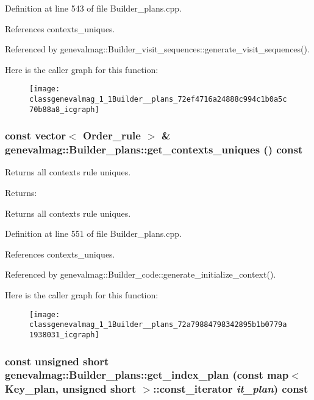 Definition at line 543 of file Builder\_\-plans.cpp.

References contexts\_\-uniques.

Referenced by genevalmag::Builder\_\-visit\_\-sequences::generate\_\-visit\_\-sequences().

Here is the caller graph for this function:\nopagebreak
\begin{figure}[H]
\begin{center}
\leavevmode
\texttt{[image: classgenevalmag\_1\_1Builder\_\_plans\_72ef4716a24888c994c1b0a5c70b88a8\_icgraph]}
\end{center}
\end{figure}
\hypertarget{classgenevalmag_1_1Builder__plans_72a79884798342895b1b0779a1938031}{
\subsubsection[{get\_\-contexts\_\-uniques}]{\setlength{\rightskip}{0pt plus 5cm}const vector$<$ {\bf Order\_\-rule} $>$ \& genevalmag::Builder\_\-plans::get\_\-contexts\_\-uniques () const}}
\label{classgenevalmag_1_1Builder__plans_72a79884798342895b1b0779a1938031}


Returns all contexts rule uniques. \begin{Desc}
\item[Returns:]\end{Desc}
Returns all contexts rule uniques. 

Definition at line 551 of file Builder\_\-plans.cpp.

References contexts\_\-uniques.

Referenced by genevalmag::Builder\_\-code::generate\_\-initialize\_\-context().

Here is the caller graph for this function:\nopagebreak
\begin{figure}[H]
\begin{center}
\leavevmode
\texttt{[image: classgenevalmag\_1\_1Builder\_\_plans\_72a79884798342895b1b0779a1938031\_icgraph]}
\end{center}
\end{figure}
\hypertarget{classgenevalmag_1_1Builder__plans_7748b68109c6c6aa805bbd1886dd6029}{
\subsubsection[{get\_\-index\_\-plan}]{\setlength{\rightskip}{0pt plus 5cm}const unsigned short genevalmag::Builder\_\-plans::get\_\-index\_\-plan (const map$<$ {\bf Key\_\-plan}, unsigned short $>$::const\_\-iterator {\em it\_\-plan}) const}}
\label{classgenevalmag_1_1Builder__plans_7748b68109c6c6aa805bbd1886dd6029}


